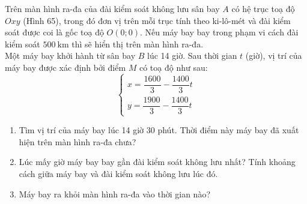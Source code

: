 \begin{bt}%
Trên màn hình ra-đa của đài kiểm soát không lưu sân bay $A$ có hệ trục toạ độ $Oxy$ (Hình 65), trong đó đơn vị trên mỗi trục tính theo ki-lô-mét và đài kiểm soát được coi là gốc toạ độ $O(0 ; 0)$. Nếu máy bay bay trong phạm vi cách đài kiểm soát $500 \mathrm{~km}$ thì sẽ hiển thị trên màn hình ra-đa.\\
Một máy bay khởi hành từ sân bay $B$ lúc 14 giờ. Sau thời gian $t$ (giờ), vị trí của máy bay được xác định bởi điểm $M$ có toạ độ như sau:
\[\left\{ {\begin{array}{*{50}{c}}
  {x = \dfrac{{1600}}{3} - \dfrac{{1400}}{3}t} \\
  {y = \dfrac{{1900}}{3} - \dfrac{{1400}}{3}t}
\end{array}} \right.\]
\begin{enumerate}
\item Tìm vị trí của máy bay lúc 14 giờ 30 phút. Thời điểm này máy bay đã xuất hiện trên màn hình ra-đa chưa?
\item Lúc mấy giờ máy bay bay gần đài kiểm soát không lưu nhất? Tính khoảng cách giữa máy bay và đài kiểm soát không lưu lúc đó.
\item Máy bay ra khỏi màn hình ra-đa vào thời gian nào?
\end{enumerate}
\end{bt}

